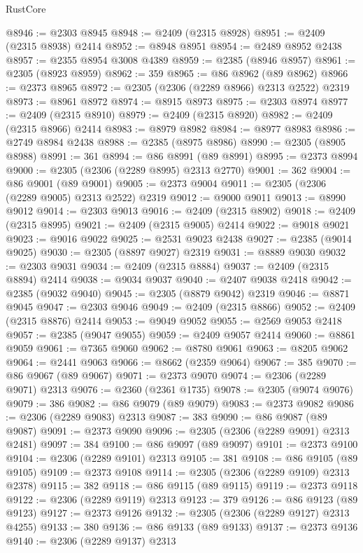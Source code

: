 \begin{lexlean}{RustCore}
\begin{coremodule}
@8946 := @2303 @8945
@8948 := @2409 (@2315 @8928)
@8951 := @2409 (@2315 @8938) @2414
@8952 := @8948 @8951
@8954 := @2489 @8952 @2438
@8957 := @2355 @8954 @3008 @4389
@8959 := @2385 (@8946 @8957)
@8961 := @2305 (@8923 @8959)
@8962 := 359
@8965 := @86 @8962 (@89 @8962)
@8966 := @2373 @8965
@8972 := @2305 (@2306 (@2289 @8966) @2313 @2522) @2319
@8973 := @8961 @8972
@8974 := @8915 @8973
@8975 := @2303 @8974
@8977 := @2409 (@2315 @8910)
@8979 := @2409 (@2315 @8920)
@8982 := @2409 (@2315 @8966) @2414
@8983 := @8979 @8982
@8984 := @8977 @8983
@8986 := @2749 @8984 @2438
@8988 := @2385 (@8975 @8986)
@8990 := @2305 (@8905 @8988)
@8991 := 361
@8994 := @86 @8991 (@89 @8991)
@8995 := @2373 @8994
@9000 := @2305 (@2306 (@2289 @8995) @2313 @2770)
@9001 := 362
@9004 := @86 @9001 (@89 @9001)
@9005 := @2373 @9004
@9011 := @2305 (@2306 (@2289 @9005) @2313 @2522) @2319
@9012 := @9000 @9011
@9013 := @8990 @9012
@9014 := @2303 @9013
@9016 := @2409 (@2315 @8902)
@9018 := @2409 (@2315 @8995)
@9021 := @2409 (@2315 @9005) @2414
@9022 := @9018 @9021
@9023 := @9016 @9022
@9025 := @2531 @9023 @2438
@9027 := @2385 (@9014 @9025)
@9030 := @2305 (@8897 @9027) @2319
@9031 := @8889 @9030
@9032 := @2303 @9031
@9034 := @2409 (@2315 @8884)
@9037 := @2409 (@2315 @8894) @2414
@9038 := @9034 @9037
@9040 := @2407 @9038 @2418
@9042 := @2385 (@9032 @9040)
@9045 := @2305 (@8879 @9042) @2319
@9046 := @8871 @9045
@9047 := @2303 @9046
@9049 := @2409 (@2315 @8866)
@9052 := @2409 (@2315 @8876) @2414
@9053 := @9049 @9052
@9055 := @2569 @9053 @2418
@9057 := @2385 (@9047 @9055)
@9059 := @2409 @9057 @2414
@9060 := @8861 @9059
@9061 := @7365 @9060
@9062 := @8780 @9061
@9063 := @8205 @9062
@9064 := @2441 @9063
@9066 := @8662 (@2359 @9064)
@9067 := 385
@9070 := @86 @9067 (@89 @9067)
@9071 := @2373 @9070
@9074 := @2306 (@2289 @9071) @2313
@9076 := @2360 (@2361 @1735)
@9078 := @2305 (@9074 @9076)
@9079 := 386
@9082 := @86 @9079 (@89 @9079)
@9083 := @2373 @9082
@9086 := @2306 (@2289 @9083) @2313
@9087 := 383
@9090 := @86 @9087 (@89 @9087)
@9091 := @2373 @9090
@9096 := @2305 (@2306 (@2289 @9091) @2313 @2481)
@9097 := 384
@9100 := @86 @9097 (@89 @9097)
@9101 := @2373 @9100
@9104 := @2306 (@2289 @9101) @2313
@9105 := 381
@9108 := @86 @9105 (@89 @9105)
@9109 := @2373 @9108
@9114 := @2305 (@2306 (@2289 @9109) @2313 @2378)
@9115 := 382
@9118 := @86 @9115 (@89 @9115)
@9119 := @2373 @9118
@9122 := @2306 (@2289 @9119) @2313
@9123 := 379
@9126 := @86 @9123 (@89 @9123)
@9127 := @2373 @9126
@9132 := @2305 (@2306 (@2289 @9127) @2313 @4255)
@9133 := 380
@9136 := @86 @9133 (@89 @9133)
@9137 := @2373 @9136
@9140 := @2306 (@2289 @9137) @2313

\end{coremodule}
\end{lexlean}

